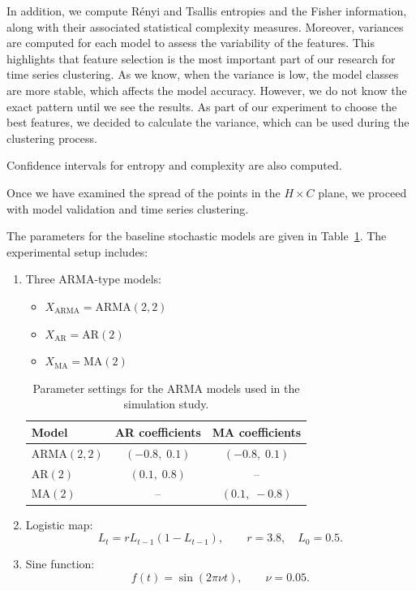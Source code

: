 \documentclass[12pt,a4paper]{article}
\begin{document}
In addition, we compute R\'enyi and Tsallis entropies and the Fisher information, along with their associated statistical complexity measures.  
Moreover, variances are computed for each model to assess the variability of the features. This highlights that feature selection is the most important part of our research for time series clustering. As we know, when the variance is low, the model classes are more stable, which affects the model accuracy. However, we do not know the exact pattern until we see the results. As part of our experiment to choose the best features, we decided to calculate the variance, which can be used during the clustering process.

Confidence intervals for entropy and complexity are also computed.

Once we have examined the spread of the points in the $H \times C$ plane, we proceed with model validation and time series clustering.


The parameters for the baseline stochastic models are given in Table~\ref{tab:parameters}.  
The experimental setup includes:

\begin{enumerate}
	\item Three $\mathrm{ARMA}$-type models:
	\begin{itemize}
		\item $X_{\text{ARMA}} = \mathrm{ARMA}(2,2)$
		\item $X_{\text{AR}}   = \mathrm{AR}(2)$
		\item $X_{\text{MA}}   = \mathrm{MA}(2)$
	\end{itemize}
	
	\begin{table}[H]
		\centering
		\caption{Parameter settings for the $\mathrm{ARMA}$ models used in the simulation study.}
		\label{tab:parameters}
		\begin{tabular}{lcc}
			\toprule
			\textbf{Model} & \textbf{AR coefficients} & \textbf{MA coefficients} \\ 
			\hline
			$\mathrm{ARMA}(2,2)$ & $(-0.8,\; 0.1)$ & $(-0.8,\; 0.1)$ \\ 
			\hline 
			$\mathrm{AR}(2)$     & $(0.1,\; 0.8)$ & -- \\ 
			\hline 
			$\mathrm{MA}(2)$     & --             & $(0.1,\; -0.8)$ \\ 
			\bottomrule
		\end{tabular}
	\end{table}
	
	\item Logistic map:
	\[
	L_t = r L_{t-1}(1 - L_{t-1}), \qquad r = 3.8,\quad L_0 = 0.5.
	\]

	\item Sine function:
	\[
	f(t) = \sin(2\pi \nu t), \qquad \nu = 0.05.
	\]
\end{enumerate}
\end{document}
